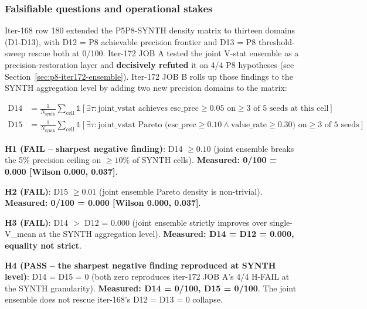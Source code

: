 \documentclass{article}
\providecommand{\secref}[1]{Section~\ref{#1}}
\begin{document}
\clearpage 

\subsubsection{Falsifiable questions and operational stakes}
Iter-168 row 180 extended the P5P8-SYNTH density matrix to thirteen
domains (D1-D13), with D12 = P8 achievable precision frontier and
D13 = P8 threshold-sweep rescue both at 0/100. Iter-172 JOB A tested
the joint V-stat ensemble as a precision-restoration layer and
\textbf{decisively refuted} it on 4/4 P8 hypotheses (see
\secref{sec:p8-iter172-ensemble}). Iter-172 JOB B rolls up those
findings to the SYNTH aggregation level by adding two new precision
domains to the matrix:

\begin{align*}
\text{D14} &= \frac{1}{N_\text{synth}} \sum_{\text{cell}} \mathbb{1}\left[
\exists \tau : \text{joint\_vstat achieves esc\_prec} \geq 0.05
\text{ on} \geq 3 \text{ of 5 seeds at this cell}\right] \\
\text{D15} &= \frac{1}{N_\text{synth}} \sum_{\text{cell}} \mathbb{1}\left[
\exists \tau : \text{joint\_vstat Pareto (esc\_prec} \geq 0.10 \wedge
\text{value\_rate} \geq 0.30) \text{ on} \geq 3 \text{ of 5 seeds}\right]
\end{align*}

\textbf{H1 (FAIL -- sharpest negative finding)}: D14 $\geq 0.10$
(joint ensemble breaks the 5\% precision ceiling on $\geq 10\%$ of
SYNTH cells). \textbf{Measured: 0/100 = 0.000 [Wilson 0.000, 0.037]}.

\textbf{H2 (FAIL)}: D15 $\geq 0.01$ (joint ensemble Pareto density
is non-trivial). \textbf{Measured: 0/100 = 0.000 [Wilson 0.000, 0.037]}.

\textbf{H3 (FAIL)}: D14 $>$ D12 = 0.000 (joint ensemble strictly
improves over single-V\_mean at the SYNTH aggregation level).
\textbf{Measured: D14 = D12 = 0.000, equality not strict}.

\textbf{H4 (PASS -- the sharpest negative finding reproduced at
SYNTH level)}: D14 = D15 = 0 (both zero reproduces iter-172 JOB A's
4/4 H-FAIL at the SYNTH granularity). \textbf{Measured: D14 = 0/100,
D15 = 0/100}. The joint ensemble does not rescue iter-168's
D12 = D13 = 0 collapse.
\end{document}
